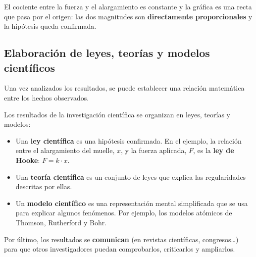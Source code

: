\begin{center}
\end{center}

El cociente entre la fuerza y el alargamiento es constante y la gráfica es una recta que pasa por el origen: las dos magnitudes son \textbf{directamente proporcionales} y la hipótesis queda confirmada.

\subsection{Elaboración de leyes, teorías y modelos científicos}

Una vez analizados los resultados, se puede establecer una relación matemática entre los hechos observados.

\begin{definition}
    Los resultados de la investigación científica se organizan en leyes, teorías y modelos:
    \begin{itemize}
        \item Una \textbf{ley científica} es una hipótesis confirmada. En el ejemplo, la relación entre el alargamiento del muelle, \(x\), y la fuerza aplicada, \(F\), es la \textbf{ley de Hooke}: \(F = k \cdot x\).
        \item Una \textbf{teoría científica} es un conjunto de leyes que explica las regularidades descritas por ellas.
        \item Un \textbf{modelo científico} es una representación mental simplificada que se usa para explicar algunos fenómenos. Por ejemplo, los modelos atómicos de Thomson, Rutherford y Bohr.
    \end{itemize}
\end{definition}

Por último, los resultados se \textbf{comunican} (en revistas científicas, congresos\ldots) para que otros investigadores puedan comprobarlos, criticarlos y ampliarlos.


